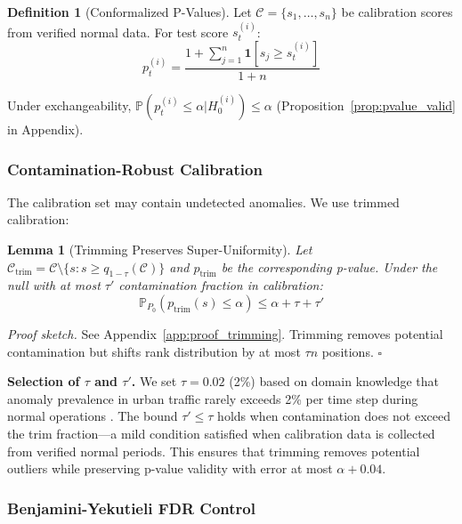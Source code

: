 \documentclass{article}
\theoremstyle{plain}
\newtheorem{lemma}[theorem]{Lemma}
\theoremstyle{definition}
\newtheorem{definition}[theorem]{Definition}
\theoremstyle{remark}
\begin{document}
\begin{definition}[Conformalized P-Values]
\label{def:pvalue}
Let $\mathcal{C} = \{s_1, \ldots, s_n\}$ be calibration scores from verified normal data. For test score $s_t^{(i)}$:
\begin{equation}
p_t^{(i)} = \frac{1 + \sum_{j=1}^n \mathbf{1}[s_j \geq s_t^{(i)}]}{1 + n}
\label{eq:pvalue}
\end{equation}
\end{definition}

Under exchangeability, $\mathbb{P}(p_t^{(i)} \leq \alpha | H_0^{(i)}) \leq \alpha$ (Proposition~\ref{prop:pvalue_valid} in Appendix).

\subsubsection{Contamination-Robust Calibration}

The calibration set may contain undetected anomalies. We use trimmed calibration:

\begin{lemma}[Trimming Preserves Super-Uniformity]
\label{lem:trimming}
Let $\mathcal{C}_{\text{trim}} = \mathcal{C} \setminus \{s : s \geq q_{1-\tau}(\mathcal{C})\}$ and $p_{\text{trim}}$ be the corresponding p-value. Under the null with at most $\tau'$ contamination fraction in calibration:
\begin{equation}
\mathbb{P}_{P_0}(p_{\text{trim}}(s) \leq \alpha) \leq \alpha + \tau + \tau'
\end{equation}
\end{lemma}

\emph{Proof sketch.} See Appendix~\ref{app:proof_trimming}. Trimming removes potential contamination but shifts rank distribution by at most $\tau n$ positions. \hfill $\square$

\textbf{Selection of $\tau$ and $\tau'$.} We set $\tau = 0.02$ (2\%) based on domain knowledge that anomaly prevalence in urban traffic rarely exceeds 2\% per time step during normal operations \citep{zheng2014urban}. The bound $\tau' \leq \tau$ holds when contamination does not exceed the trim fraction---a mild condition satisfied when calibration data is collected from verified normal periods. This ensures that trimming removes potential outliers while preserving p-value validity with error at most $\alpha + 0.04$.

\subsubsection{Benjamini-Yekutieli FDR Control}
\end{document}
